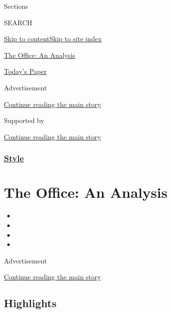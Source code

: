 Sections

SEARCH

\protect\hyperlink{site-content}{Skip to
content}\protect\hyperlink{site-index}{Skip to site index}

\href{https://www.nytimes3xbfgragh.onion/spotlight/the-office-an-analysis}{The
Office: An Analysis}

\href{https://myaccount.nytimes3xbfgragh.onion/auth/login?response_type=cookie\&client_id=vi}{}

\href{https://www.nytimes3xbfgragh.onion/section/todayspaper}{Today's
Paper}

Advertisement

\protect\hyperlink{after-top}{Continue reading the main story}

Supported by

\protect\hyperlink{after-sponsor}{Continue reading the main story}

\hypertarget{style}{%
\subsubsection{\texorpdfstring{\href{/section/style}{Style}}{Style}}\label{style}}

\hypertarget{the-office-an-analysis}{%
\section{The Office: An Analysis}\label{the-office-an-analysis}}

\begin{itemize}
\item
\item
\item
\item
\end{itemize}

Advertisement

\protect\hyperlink{after-subheader}{Continue reading the main story}

\hypertarget{highlights}{%
\subsection{Highlights}\label{highlights}}

